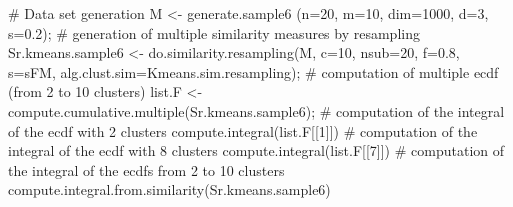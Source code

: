 \documentclass{article}
\begin{document}
\begin{Examples}
\begin{ExampleCode}
# Data set generation
M <- generate.sample6 (n=20, m=10, dim=1000, d=3, s=0.2);
# generation of multiple similarity measures by resampling
Sr.kmeans.sample6 <- do.similarity.resampling(M, c=10, nsub=20, f=0.8, s=sFM, 
                                      alg.clust.sim=Kmeans.sim.resampling); 
# computation of multiple ecdf (from 2 to 10 clusters)
list.F <- compute.cumulative.multiple(Sr.kmeans.sample6);
# computation of the integral of the ecdf with 2 clusters
compute.integral(list.F[[1]])
# computation of the integral of the ecdf with 8 clusters
compute.integral(list.F[[7]])
# computation of the integral of the ecdfs from 2 to 10 clusters
compute.integral.from.similarity(Sr.kmeans.sample6)
\end{ExampleCode}
\end{Examples}
\end{document}
